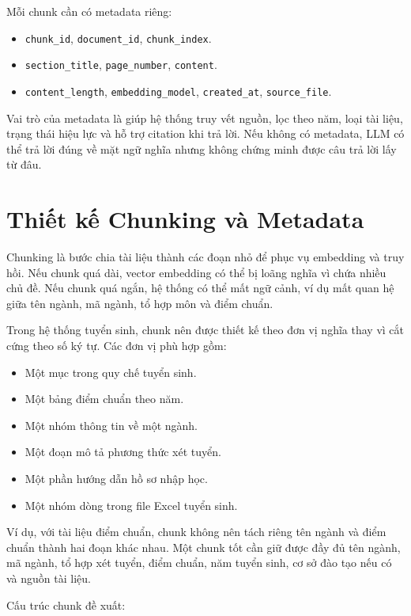 Mỗi chunk cần có metadata riêng:

\begin{itemize}
    \item \texttt{chunk\_id}, \texttt{document\_id}, \texttt{chunk\_index}.
    \item \texttt{section\_title}, \texttt{page\_number}, \texttt{content}.
    \item \texttt{content\_length}, \texttt{embedding\_model}, \texttt{created\_at}, \texttt{source\_file}.
\end{itemize}

Vai trò của metadata là giúp hệ thống truy vết nguồn, lọc theo năm, loại tài liệu, trạng thái hiệu lực và hỗ trợ citation khi trả lời. Nếu không có metadata, LLM có thể trả lời đúng về mặt ngữ nghĩa nhưng không chứng minh được câu trả lời lấy từ đâu.

\section{Thiết kế Chunking và Metadata}

Chunking là bước chia tài liệu thành các đoạn nhỏ để phục vụ embedding và truy hồi. Nếu chunk quá dài, vector embedding có thể bị loãng nghĩa vì chứa nhiều chủ đề. Nếu chunk quá ngắn, hệ thống có thể mất ngữ cảnh, ví dụ mất quan hệ giữa tên ngành, mã ngành, tổ hợp môn và điểm chuẩn.

Trong hệ thống tuyển sinh, chunk nên được thiết kế theo đơn vị nghĩa thay vì cắt cứng theo số ký tự. Các đơn vị phù hợp gồm:

\begin{itemize}
    \item Một mục trong quy chế tuyển sinh.
    \item Một bảng điểm chuẩn theo năm.
    \item Một nhóm thông tin về một ngành.
    \item Một đoạn mô tả phương thức xét tuyển.
    \item Một phần hướng dẫn hồ sơ nhập học.
    \item Một nhóm dòng trong file Excel tuyển sinh.
\end{itemize}

Ví dụ, với tài liệu điểm chuẩn, chunk không nên tách riêng tên ngành và điểm chuẩn thành hai đoạn khác nhau. Một chunk tốt cần giữ được đầy đủ tên ngành, mã ngành, tổ hợp xét tuyển, điểm chuẩn, năm tuyển sinh, cơ sở đào tạo nếu có và nguồn tài liệu.

Cấu trúc chunk đề xuất:

